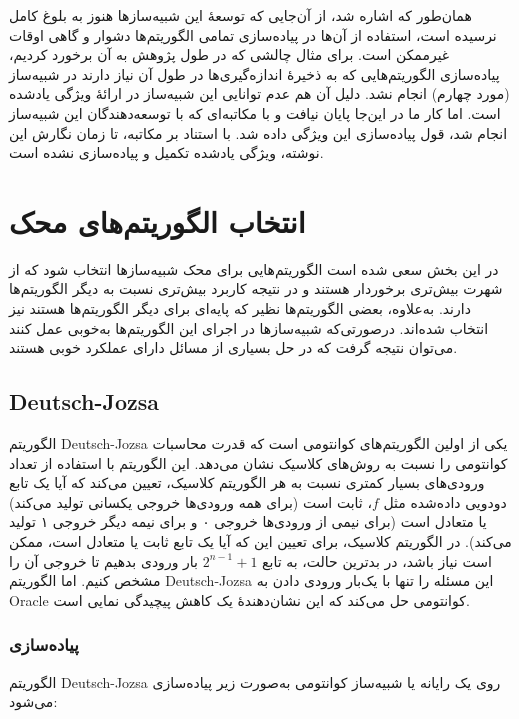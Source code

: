همان‌طور که اشاره شد، از آن‌جایی که توسعهٔ این شبیه‌سازها هنوز به بلوغ کامل نرسیده است، استفاده از آن‌ها در پیاده‌سازی تمامی الگوریتم‌ها دشوار و گاهی اوقات غیرممکن است. برای مثال چالشی که در طول پژوهش به آن برخورد کردیم، پیاده‌سازی الگوریتم‌هایی که به ذخیرهٔ اندازه‌گیری‌ها در طول آن نیاز دارند در شبیه‌ساز  (مورد چهارم) انجام نشد. دلیل آن هم عدم توانایی این شبیه‌ساز در ارائهٔ ویژگی یادشده است. اما کار ما در این‌جا پایان نیافت و با مکاتبه‌ای که با توسعه‌دهندگان این شبیه‌ساز انجام شد، قول پیاده‌سازی این ویژگی داده شد. با استناد بر مکاتبه، تا زمان نگارش این نوشته، ویژگی یادشده تکمیل و پیاده‌سازی نشده است.
\section{انتخاب الگوریتم‌های محک}
در این بخش سعی شده است الگوریتم‌هایی برای محک شبیه‌سازها انتخاب شود که از شهرت بیش‌تری برخوردار هستند و در نتیجه کاربرد بیش‌تری نسبت به دیگر الگوریتم‌ها دارند. به‌علاوه، بعضی الگوریتم‌ها نظیر
که پایه‌ای برای دیگر الگوریتم‌ها هستند نیز انتخاب شده‌اند. درصورتی‌که شبیه‌سازها در اجرای این الگوریتم‌ها به‌خوبی عمل کنند می‌توان نتیجه گرفت که در حل بسیاری از مسائل دارای عملکرد خوبی هستند.
\label{sec:algorithm_selection}
\subsection{Deutsch-Jozsa}
الگوریتم Deutsch-Jozsa یکی از اولین الگوریتم‌های کوانتومی است که قدرت محاسبات کوانتومی را نسبت به روش‌های کلاسیک نشان می‌دهد. این الگوریتم با استفاده از تعداد ورودی‌های بسیار کمتری نسبت به هر الگوریتم کلاسیک، تعیین می‌کند که آیا یک تابع دودویی داده‌شده مثل $f$، ثابت است (برای همه ورودی‌ها خروجی یکسانی تولید می‌کند) یا متعادل است (برای نیمی از ورودی‌ها خروجی ۰ و برای نیمه دیگر خروجی ۱ تولید می‌کند). در الگوریتم کلاسیک، برای تعیین این که آیا یک تابع ثابت یا متعادل است، ممکن است نیاز باشد، در بدترین حالت، به تابع $2^{n-1} + 1$ بار ورودی بدهیم تا خروجی آن را مشخص کنیم. اما الگوریتم Deutsch-Jozsa این مسئله را تنها با یک‌بار ورودی دادن به Oracle کوانتومی حل می‌کند که این نشان‌دهندهٔ یک کاهش پیچیدگی نمایی است.

\subsubsection{پیاده‌سازی}
الگوریتم Deutsch-Jozsa روی یک رایانه یا شبیه‌ساز کوانتومی به‌صورت زیر پیاده‌سازی می‌شود: 

